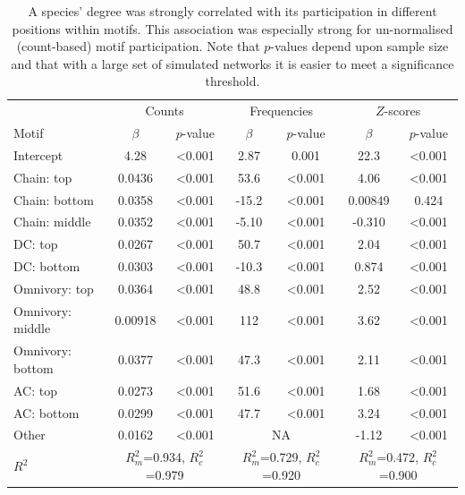 \documentclass[12pt]{article}
\begin{document}
\begin{spacing}{2.0}
			\begin{table}[hb!]
    			\caption{A species' degree was strongly correlated with its participation in different positions within motifs. This association was especially strong for un-normalised (count-based) motif participation. Note that $p$-values depend upon sample size and that with a large set of simulated networks it is easier to meet a significance threshold.}
    			\label{tab:positions_vs_deg}
    			\begin{tabular}{l | c c | c c | c c}
    			& \multicolumn{2}{c|}{Counts} & \multicolumn{2}{c}{Frequencies} & \multicolumn{2}{|c}{$Z$-scores} \\
    			Motif & $\beta$ & $p$-value & $\beta$ & $p$-value & $\beta$ & $p$-value \\
    			\hline
                Intercept	&	4.28	&	\textless0.001	&	2.87	&	0.001	&	22.3	&	\textless0.001	\\
                Chain: top	&	0.0436	&	\textless0.001	&	53.6	&	\textless0.001	&	4.06	&	\textless0.001	\\
                Chain: bottom	&	0.0358	&	\textless0.001	&	-15.2	&	\textless0.001	&	0.00849	&	0.424	\\
                Chain: middle	&	0.0352	&	\textless0.001	&	-5.10	&	\textless0.001	&	-0.310	&	\textless0.001	\\
                DC: top	&	0.0267	&	\textless0.001	&	50.7	&	\textless0.001	&	2.04	&	\textless0.001	\\
                DC: bottom	&	0.0303	&	\textless0.001	&	-10.3	&	\textless0.001	&	0.874	&	\textless0.001	\\
                Omnivory: top	&	0.0364	&	\textless0.001	&	48.8	&	\textless0.001	&	2.52	&	\textless0.001	\\
                Omnivory: middle	&	0.00918 	&	\textless0.001	&	112	&	\textless0.001	&	3.62	&	\textless0.001	\\
                Omnivory: bottom	&	0.0377	&	\textless0.001	&	47.3	&	\textless0.001	&	2.11	&	\textless0.001	\\
                AC: top	&	0.0273	&	\textless0.001	&	51.6	&	\textless0.001	&	1.68	&	\textless0.001	\\
                AC: bottom	&	0.0299	&	\textless0.001	&	47.7	&	\textless0.001	&	3.24	&	\textless0.001	\\
                Other	&	0.0162	&	\textless0.001	& \multicolumn{2}{c|}{NA} &	-1.12	&	\textless0.001	\\
    			\hline
    			$R^2$ & \multicolumn{2}{c|}{\tiny{$R^2_m$=0.934, $R^2_c$=0.979}} & \multicolumn{2}{c}{\tiny{$R^2_m$=0.729, $R^2_c$=0.920}} & \multicolumn{2}{|c}{\tiny{$R^2_m$=0.472, $R^2_c$=0.900}} \\
    			\hline
                \end{tabular}
                \end{table}



\end{spacing}
\end{document}
